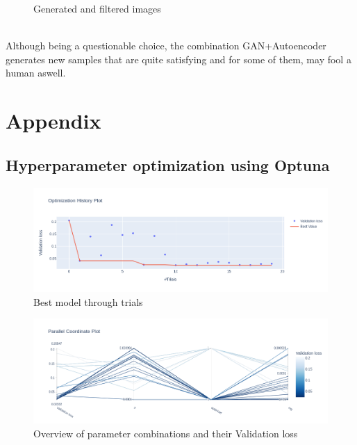 \documentclass[11pt,a4paper,twocolumn]{IEEEtran}
\begin{document}
	\begin{figure}[h]
		\centering
		\vspace*{-.5cm}\\
		\vspace*{-.5cm}\\
		\vspace*{-.5cm}\\
		\vspace*{-.5cm}\\
		\vspace*{-.5cm}\\
		\caption{Generated and filtered images}
		\label{fig:filter}
	\end{figure}\\
	Although being a questionable choice, the combination GAN+Autoencoder generates new samples that are quite satisfying and for some of them, may fool a human aswell.
	\newpage
	\onecolumn
	\section{\textbf{Appendix}}
	
		\subsection{Hyperparameter optimization using Optuna}
		\begin{figure}[h]
			\centering
			\includegraphics[width=1\linewidth]{../imgs/newplot(2)}
			\caption{Best model through trials}
			\label{fig:newplot2}
		\end{figure}
	\begin{figure}[h]
		\centering
		\includegraphics[width=1\linewidth]{../imgs/newplot(3)}
		\caption{Overview of parameter combinations and their Validation loss}
		\label{fig:newplot3}
	\end{figure}\newpage
\end{document}
